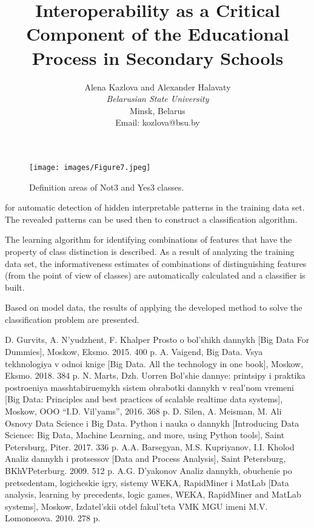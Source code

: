\documentclass{article}
\title{\centering \vspace{-15mm} \huge \textbf{Interoperability as a Critical Component of the
Educational Process in Secondary Schools}}
\author{Alena Kazlova and Alexander Halavaty\\ \small
\textit{Belarusian State University}\\ \small
Minsk, Belarus\\ \small
Email: kozlova@bsu.by}
\date{}
\begin{document}
\begin{multicols}{2}
\begin{figure}[H]
    \centering
    \texttt{[image: images/Figure7.jpeg]}
    \caption{\small Definition areas of Not3 and Yes3 classes.}
    \label{fig:enter-label}
\end{figure}
\fontsize{10pt}{12pt}\selectfont
\hspace{-1.5em}for automatic detection of hidden interpretable patterns
in the training data set. The revealed patterns can be used
then to construct a classification algorithm.
\par The learning algorithm for identifying combinations
of features that have the property of class distinction
is described. As a result of analyzing the training data
set, the informativeness estimates of combinations of
distinguishing features (from the point of view of classes)
are automatically calculated and a classifier is built.
\par Based on model data, the results of applying the
developed method to solve the classification problem are
presented.
\par
\renewcommand{\refname}{\centering References}
\fontsize{8pt}{9pt}\selectfont
\begin{thebibliography}{26}
\vspace{2.5mm}
\setlength{\itemsep}{0pt}
 D. Gurvits, A. N’yudzhent, F. Khalper Prosto o bol’shikh dannykh
[Big Data For Dummies], Moskow, Eksmo. 2015. 400 p.
 A. Vaigend, Big Data. Vsya tekhnologiya v odnoi knige [Big Data.
All the technology in one book], Moskow, Eksmo. 2018. 384 p.
 N. Marts, Dzh. Uorren Bol’shie dannye: printsipy i praktika postroeniya masshtabiruemykh sistem obrabotki dannykh v
real’nom vremeni [Big Data: Principles and best practices of
scalable realtime data systems], Moskow, OOO “I.D. Vil’yams”,
2016. 368 p.
 D. Silen, A. Meisman, M. Ali Osnovy Data Science i Big
Data. Python i nauka o dannykh [Introducing Data Science: Big
Data, Machine Learning, and more, using Python tools], Saint
Petersburg, Piter. 2017. 336 p.
 A.A. Barsegyan, M.S. Kupriyanov, I.I. Kholod Analiz dannykh i
protsessov [Data and Process Analysis], Saint Petersburg, BKhVPeterburg. 2009. 512 p.
 A.G. D’yakonov Analiz dannykh, obuchenie po pretsedentam,
logicheskie igry, sistemy WEKA, RapidMiner i MatLab [Data
analysis, learning by precedents, logic games, WEKA, RapidMiner and MatLab systems], Moskow, Izdatel’skii otdel fakul’teta
VMK MGU imeni M.V. Lomonosova. 2010. 278 p.

\end{thebibliography}
\end{multicols}
\end{document}
